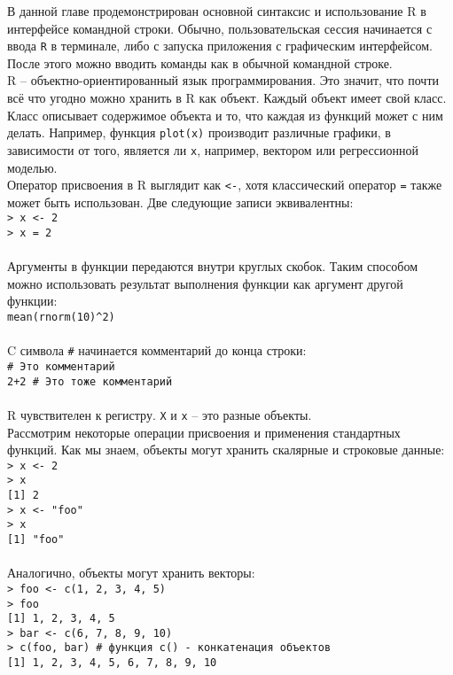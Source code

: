 В данной главе продемонстрирован основной синтаксис и использование R в интерфейсе 
командной строки. Обычно, пользовательская сессия начинается с ввода \texttt{R} в 
терминале, либо с запуска приложения с графическим интерфейсом. После этого можно вводить
команды как в обычной командной строке.\\
\indent R -- объектно-ориентированный язык программирования. Это значит, что почти всё что 
угодно можно хранить в R как объект. Каждый объект имеет свой класс. Класс описывает
содержимое объекта и то, что каждая из функций может с ним делать. Например, функция
\texttt{plot(x)} производит различные графики, в зависимости от того, является ли 
\texttt{x}, например, вектором или регрессионной моделью. \\
\indent Оператор присвоения в R выглядит как \texttt{<-}, хотя классический оператор \texttt{=}
также может быть использован. Две следующие записи эквивалентны: \\
\indent \texttt{> x <- 2} \\
\indent \texttt{> x = 2} \\ \\
\indent Аргументы в функции передаются внутри круглых скобок. Таким способом можно использовать 
результат выполнения функции как аргумент другой функции: \\
\indent \texttt{mean(rnorm(10)\^{}2)} \\ \\
\indent C символа \texttt{\#} начинается комментарий до конца строки: \\
\indent \texttt{\# Это комментарий} \\
\indent \texttt{2+2 \# Это тоже комментарий} \\ \\
\indent R чувствителен к регистру. \texttt{X} и \texttt{x} -- это разные объекты. \\
\indent Рассмотрим некоторые операции присвоения и применения стандартных функций. Как мы
знаем, объекты могут хранить скалярные и строковые данные: \\
\indent \texttt{> x <- 2} \\
\indent \texttt{> x} \\
\indent \texttt{[1] 2} \\
\indent \texttt{> x <- "foo"} \\
\indent \texttt{> x } \\
\indent \texttt{[1] "foo"} \\ \\
\indent Аналогично, объекты могут хранить векторы: \\
\indent \texttt{> foo <- c(1, 2, 3, 4, 5)} \\
\indent \texttt{> foo} \\
\indent \texttt{[1] 1, 2, 3, 4, 5} \\
\indent \texttt{> bar <- c(6, 7, 8, 9, 10)} \\
\indent \texttt{> c(foo, bar) \# функция c() - конкатенация объектов} \\
\indent \texttt{[1] 1, 2, 3, 4, 5, 6, 7, 8, 9, 10} \\
